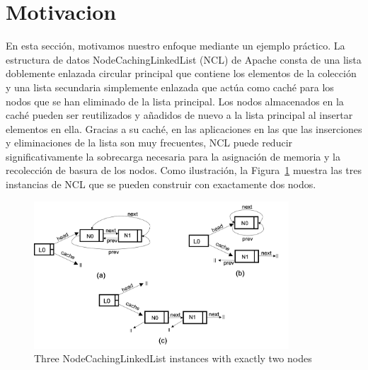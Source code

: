 \section{Motivacion}


En esta sección, motivamos nuestro enfoque mediante un ejemplo práctico. La estructura de datos NodeCachingLinkedList (NCL) de Apache \cite{apache} consta de una lista doblemente enlazada circular principal que contiene los elementos de la colección y una lista secundaria simplemente enlazada que actúa como caché para los nodos que se han eliminado de la lista principal. Los nodos almacenados en la caché pueden ser reutilizados y añadidos de nuevo a la lista principal al insertar elementos en ella. Gracias a su caché, en las aplicaciones en las que las inserciones y eliminaciones de la lista son muy frecuentes, NCL puede reducir significativamente la sobrecarga necesaria para la asignación de memoria y la recolección de basura de los nodos. 
Como ilustración, la Figura~\ref{fig:ncl-instances} muestra las tres instancias de NCL que se pueden construir con exactamente dos nodos.
\begin{figure}[H]
    \centering
    \includegraphics[width=0.85\textwidth]{NCL-instances.png}
    \caption{Three NodeCachingLinkedList instances with exactly two nodes}
    \label{fig:ncl-instances}
\end{figure}


